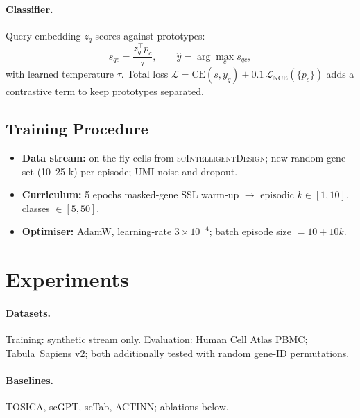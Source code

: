\documentclass{article}
\begin{document}

\paragraph{Classifier.}
Query embedding \(z_q\) scores against prototypes:
\begin{equation}
	s_{qc} = \frac{z_q^{\top} p_c}{\tau},\qquad
	\hat{y} = \arg\max_{c}s_{qc},
\end{equation}
with learned temperature \(\tau\).  
Total loss
\(
\mathcal{L}= \mathrm{CE}(s, y_q) + 0.1\,\mathcal{L}_{\mathrm{NCE}}(\{p_c\})
\)
adds a contrastive term to keep prototypes separated.

\subsection{Training Procedure}
\begin{itemize}
	\item \textbf{Data stream:} on‑the‑fly cells from \textsc{scIntelligentDesign}; new random gene set (10–25 k) per episode; UMI noise and dropout.
	\item \textbf{Curriculum:} 5 epochs masked‑gene SSL warm‑up \(\rightarrow\) episodic \(k\in[1,10]\), classes \(\in[5,50]\).
	\item \textbf{Optimiser:} AdamW, learning‑rate \(3\!\times\!10^{-4}\); batch episode size \(=10+10k\).
\end{itemize}

\section{Experiments}
\paragraph{Datasets.}  
Training: synthetic stream only.  
Evaluation: Human Cell Atlas PBMC; Tabula~Sapiens v2; both additionally tested with random gene‑ID permutations.

\paragraph{Baselines.} TOSICA, scGPT, scTab, ACTINN; ablations below.
\end{document}

